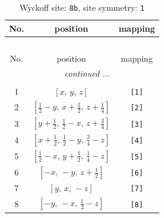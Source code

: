 \documentclass[fleqn,8pt]{jsarticle}
\begin{document}
\begin{longtable}{ccc}
\caption{Wyckoff site: {\tt 8b}, site symmetry: {\tt 1}}
 \\
 \hline \hline
No. & position & mapping \\ \hline \endfirsthead

\multicolumn{2}{l}{\tablename\ \thetable{}} \\
 \hline \hline
No. & position & mapping \\ \hline \endhead

 \hline \hline
\multicolumn{2}{r}{\footnotesize\it continued ...} \\ \endfoot

 \hline \hline
\multicolumn{2}{r}{} \\ \endlastfoot

1 & $\left[ x,\, y,\, z \right]$ & {\tt [1]} \\ \hline
2 & $\left[ \frac{1}{2} - y,\, x + \frac{1}{2},\, z + \frac{1}{4} \right]$ & {\tt [2]} \\ \hline
3 & $\left[ y + \frac{1}{2},\, \frac{1}{2} - x,\, z + \frac{3}{4} \right]$ & {\tt [3]} \\ \hline
4 & $\left[ x + \frac{1}{2},\, \frac{1}{2} - y,\, \frac{3}{4} - z \right]$ & {\tt [4]} \\ \hline
5 & $\left[ \frac{1}{2} - x,\, y + \frac{1}{2},\, \frac{1}{4} - z \right]$ & {\tt [5]} \\ \hline
6 & $\left[ - x,\, - y,\, z + \frac{1}{2} \right]$ & {\tt [6]} \\ \hline
7 & $\left[ y,\, x,\, - z \right]$ & {\tt [7]} \\ \hline
8 & $\left[ - y,\, - x,\, \frac{1}{2} - z \right]$ & {\tt [8]} \\
\end{longtable}
\end{document}
